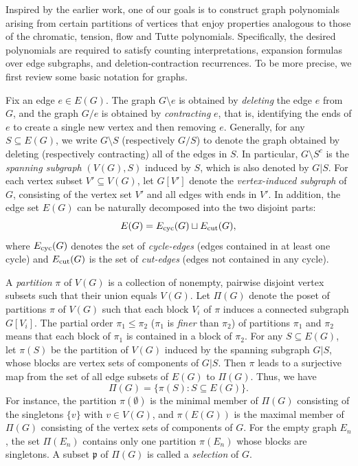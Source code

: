 \documentclass[12pt]{article}%
\numberwithin{equation}{section}
\begin{document}
Inspired by the earlier work, one of our goals is to construct graph polynomials arising from certain partitions of vertices that enjoy properties analogous to those of the chromatic, tension, flow and Tutte polynomials. Specifically, the desired polynomials are required to satisfy counting interpretations, expansion formulas over edge subgraphs, and deletion-contraction recurrences. To be more precise, we first review some basic notation for graphs.

Fix an edge $e\in E(G)$. The graph $G\setminus e$  is obtained by {\em deleting} the edge $e$ from $G$, and the graph $G/e$ is obtained by {\em contracting} $e$, that is, identifying the ends of $e$ to create a single new vertex and then removing $e$. Generally, for any $S\subseteq E(G)$, we write $G\setminus S$ (respectively $G/S$) to denote the graph obtained by deleting (respectively contracting) all of the edges in $S$. In particular, $G\setminus S^c$ is the {\em spanning subgraph} $(V(G), S)$ induced by $S$, which is also denoted by $G|S$. For each vertex subset $V'\subseteq V(G)$, let $G[V']$ denote the {\em vertex-induced subgraph} of $G$, consisting of the vertex set $V'$ and all edges with ends in $V'$. In addition, the edge set $E(G)$ can be naturally decomposed into the two disjoint parts:
\[
E(G) = E_{\rm cyc}(G)\sqcup E_{\rm cut}(G),
\]
where $E_{\rm cyc}(G)$ denotes the set of {\em cycle-edges} (edges contained in at least one cycle) and $E_{\rm cut}(G)$ is the set of {\em cut-edges} (edges not contained in any cycle). 

A {\em partition} $\pi$ of $V(G)$ is a collection of nonempty, pairwise disjoint vertex subsets such that their union equals $V(G)$. Let $\Pi(G)$ denote the poset of partitions $\pi$ of $V(G)$ such that each block $V_i$ of $\pi$ induces a connected subgraph $G[V_i]$. The partial order $\pi_1\le\pi_2$ ($\pi_1$ is {\em finer} than $\pi_2$) of partitions $\pi_1$ and $\pi_2$ means that each block of $\pi_1$ is contained in a block of $\pi_2$. For any $S\subseteq E(G)$, let $\pi(S)$ be the partition of $V(G)$ induced by the spanning subgraph $G|S$, whose blocks are vertex sets of components of  $G|S$. Then $\pi$ leads to a surjective map from the set of all edge subsets of $E(G)$ to $\Pi(G)$. 
Thus, we have
\[
\Pi(G)=\big\{\pi(S):S\subseteq E(G)\big\}.
\]
For instance, the partition $\pi(\emptyset)$ is the minimal member of $\Pi(G)$ consisting of the singletons $\{v\}$ with $v\in V(G)$, and $\pi(E(G))$ is the maximal member of $\Pi(G)$ consisting of the vertex sets of components of $G$. For the empty graph $E_n$, the set $\Pi(E_n)$ contains only one partition $\pi(E_n)$ whose blocks are singletons. A subset $\mathfrak{p}$ of $\Pi(G)$ is called a {\em selection} of $G$.
\end{document}
